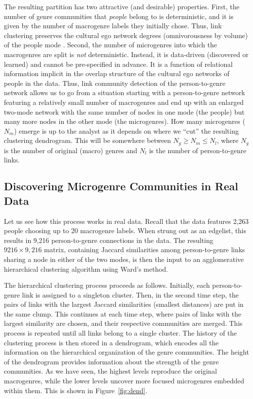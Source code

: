 \documentclass[a4paper,12pt]{extarticle}
\begin{document}
The resulting partition has two attractive (and desirable) properties. First, the number of genre communities that \textit{people} belong to is deterministic, and it is given by the number of macrogenre labels they initially chose. Thus, link clustering preserves the cultural ego network degrees (omnivorousness by volume) of the people mode \citep{lizardo14}. Second, the number of microgenres into which the macrogenres are split is {\em not} deterministic. Instead, it is data-driven (discovered or learned) and cannot be pre-specified in advance. It is a function of relational information implicit in the overlap structure of the cultural ego networks of people in the data. Thus, link community detection of the person-to-genre network allows us to go from a situation starting with a person-to-genre network featuring a relatively small number of macrogenres and end up with an enlarged two-mode network with the same number of nodes in one mode (the people) but many more nodes in the other mode (the microgenres). How many microgenres ($N_m$) emerge is up to the analyst as it depends on where we ``cut'' the resulting clustering dendrogram. This will be somewhere between $N_g \geq N_m \leq N_l$, where $N_g$ is the number of original (macro) genres and $N_l$ is the number of person-to-genre links.

\subsection{Discovering Microgenre Communities in Real Data}
Let us see how this process works in real data. Recall that the data features 2,263 people choosing up to 20 macrogenre labels. When strung out as an edgelist, this results in 9,216 person-to-genre connections in the data. The resulting $9216 \times 9,216$ matrix, containing Jaccard similarities among person-to-genre links sharing a node in either of the two modes, is then the input to an agglomerative hierarchical clustering algorithm using Ward's \citeyearpar{ward63} method. 

The hierarchical clustering process proceeds as follows. Initially, each person-to-genre link is assigned to a singleton cluster. Then, in the second time step, the pairs of links with the largest Jaccard similarities (smallest distances) are put in the same clump. This continues at each time step, where pairs of links with the largest similarity are chosen, and their respective communities are merged. This process is repeated until all links belong to a single cluster. The history of the clustering process is then stored in a dendrogram, which encodes all the information on the hierarchical organization of the genre communities. The height of the dendrogram provides information about the strength of the genre communities. As we have seen, the highest levels reproduce the original macrogenres, while the lower levels uncover more focused microgenres embedded within them. This is shown in Figure~\ref{fig:dend}. 
\end{document}
